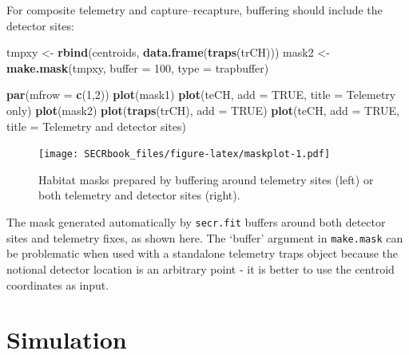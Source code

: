 \documentclass[
]{book}
\newenvironment{Shaded}{\begin{snugshade}}{\end{snugshade}}
\newcommand{\AttributeTok}[1]{\textcolor[rgb]{0.13,0.29,0.53}{#1}}
\newcommand{\ConstantTok}[1]{\textcolor[rgb]{0.56,0.35,0.01}{#1}}
\newcommand{\DecValTok}[1]{\textcolor[rgb]{0.00,0.00,0.81}{#1}}
\newcommand{\FunctionTok}[1]{\textcolor[rgb]{0.13,0.29,0.53}{\textbf{#1}}}
\newcommand{\NormalTok}[1]{#1}
\newcommand{\OtherTok}[1]{\textcolor[rgb]{0.56,0.35,0.01}{#1}}
\newcommand{\StringTok}[1]{\textcolor[rgb]{0.31,0.60,0.02}{#1}}
\begin{document}
For composite telemetry and capture--recapture, buffering should include the detector sites:

\begin{Shaded}
\begin{Highlighting}[]
\NormalTok{tmpxy }\OtherTok{\textless{}{-}} \FunctionTok{rbind}\NormalTok{(centroids, }\FunctionTok{data.frame}\NormalTok{(}\FunctionTok{traps}\NormalTok{(trCH))) }
\NormalTok{mask2 }\OtherTok{\textless{}{-}} \FunctionTok{make.mask}\NormalTok{(tmpxy, }\AttributeTok{buffer =} \DecValTok{100}\NormalTok{, }\AttributeTok{type =} \StringTok{\textquotesingle{}trapbuffer\textquotesingle{}}\NormalTok{)}
\end{Highlighting}
\end{Shaded}

\begin{Shaded}
\begin{Highlighting}[]
\FunctionTok{par}\NormalTok{(}\AttributeTok{mfrow =} \FunctionTok{c}\NormalTok{(}\DecValTok{1}\NormalTok{,}\DecValTok{2}\NormalTok{))}
\FunctionTok{plot}\NormalTok{(mask1)}
\FunctionTok{plot}\NormalTok{(teCH, }\AttributeTok{add =} \ConstantTok{TRUE}\NormalTok{, }\AttributeTok{title =} \StringTok{\textquotesingle{}Telemetry only\textquotesingle{}}\NormalTok{)}
\FunctionTok{plot}\NormalTok{(mask2)}
\FunctionTok{plot}\NormalTok{(}\FunctionTok{traps}\NormalTok{(trCH), }\AttributeTok{add =} \ConstantTok{TRUE}\NormalTok{)}
\FunctionTok{plot}\NormalTok{(teCH, }\AttributeTok{add =} \ConstantTok{TRUE}\NormalTok{, }\AttributeTok{title =} \StringTok{\textquotesingle{}Telemetry and detector sites\textquotesingle{}}\NormalTok{)}
\end{Highlighting}
\end{Shaded}

\begin{figure}
\centering
\texttt{[image: SECRbook\_files/figure-latex/maskplot-1.pdf]}
\caption{\label{fig:maskplot}Habitat masks prepared by buffering around telemetry sites (left) or both telemetry and detector sites (right).}
\end{figure}

The mask generated automatically by \texttt{secr.fit} buffers around both detector sites and telemetry fixes, as shown here. The `buffer' argument in \texttt{make.mask} can be problematic when used with a standalone telemetry traps object because the notional detector location is an arbitrary point - it is better to use the centroid coordinates as input.

\section{Simulation}\label{simulation-1}
\end{document}

